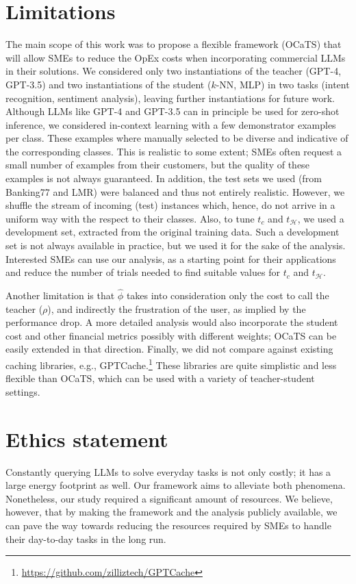 \documentclass[11pt]{article}
\begin{document}
\section{Limitations}
The main scope of this work was to propose a flexible framework (OCaTS) that will allow SMEs to reduce the OpEx costs when incorporating commercial LLMs in their solutions. We considered only two instantiations of the teacher (GPT-4, GPT-3.5) and two instantiations of the student ($k$-NN, MLP) in two tasks (intent recognition, sentiment analysis), leaving further instantiations for future work. 
Although LLMs like GPT-4 and GPT-3.5 can in principle be used for zero-shot inference, we considered in-context learning with
a few demonstrator examples per class. These examples where manually selected to be diverse and indicative of the corresponding classes. This is realistic to some extent; SMEs often request a small number of examples from their customers, but the quality of these examples is not always guaranteed.  In addition, the test sets we used (from Banking77 and LMR) 
were balanced and thus not entirely realistic. However, we shuffle the stream of incoming (test) instances which, hence, do not arrive in a uniform way with the respect to their classes. Also, to tune $t_c$ and $t_\mathcal{H}$, we used a development set, extracted from the original training data. Such a development set is not always available in practice, but we used it for the sake of the analysis. Interested SMEs can use our analysis, as a starting point for their applications and reduce the number of trials needed to find suitable values for $t_c$ and $t_\mathcal{H}$. 

Another limitation is that $\hat{\phi}$ takes into consideration only the cost to call the teacher ($\rho$), and indirectly the frustration of the user, as implied by the performance drop. A more detailed analysis would also incorporate the student cost and other financial metrics possibly with different weights; OCaTS can be easily extended in that direction. Finally, we did not compare against existing caching libraries, e.g., GPTCache.\footnote{\url{https://github.com/zilliztech/GPTCache}} These libraries are quite simplistic and less flexible than OCaTS, which can be used with a variety of teacher-student settings.

\section{Ethics statement}
Constantly querying LLMs to solve everyday tasks is not only costly; it has a large energy footprint as well. Our framework aims to alleviate both phenomena. Nonetheless, our study required a significant amount of resources. We believe, however, that by making the framework and the analysis publicly available, we can pave the way towards reducing the resources required by SMEs to handle their day-to-day tasks in the long run.
\end{document}
